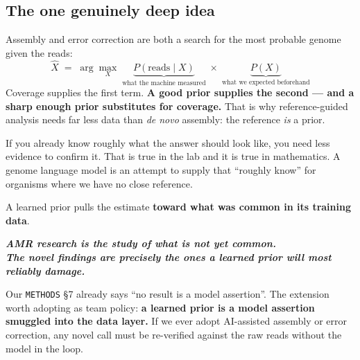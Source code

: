 \subsection{The one genuinely deep idea}

Assembly and error correction are both a search for the most probable genome given the reads:
\[
\hat{X} \;=\; \arg\max_{X}\;\underbrace{P(\text{reads}\mid X)}_{\text{what the machine measured}}\;\times\;
\underbrace{P(X)}_{\text{what we expected beforehand}}
\]
Coverage supplies the first term. \textbf{A good prior supplies the second --- and a sharp enough
prior substitutes for coverage.} That is why reference-guided analysis needs far less data than
\emph{de novo} assembly: the reference \emph{is} a prior.

\begin{plain}
If you already know roughly what the answer should look like, you need less evidence to confirm it.
That is true in the lab and it is true in mathematics. A genome language model is an attempt to
supply that ``roughly know'' for organisms where we have no close reference.
\end{plain}

\begin{alertbox}[title={The warning that matters specifically for AMR work}]
A learned prior pulls the estimate \textbf{toward what was common in its training data}.
\begin{center}
\end{center}
\vspace{-2pt}
\begin{center}\bfseries\itshape
AMR research is the study of what is not yet common.\\
The novel findings are precisely the ones a learned prior will most reliably damage.
\end{center}
\vspace{3pt}
Our \texttt{METHODS} §7 already says ``no result is a model assertion''. The extension worth adopting
as team policy: \textbf{a learned prior is a model assertion smuggled into the data layer.} If we ever
adopt AI-assisted assembly or error correction, any novel call must be re-verified against the raw
reads without the model in the loop.
\end{alertbox}
